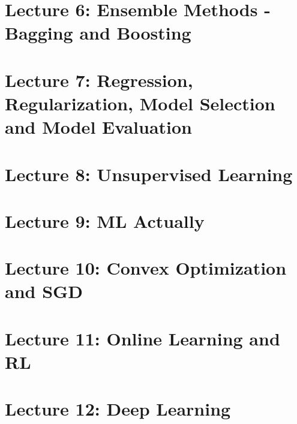 \documentclass[11pt]{article}
\begin{document}
\newpage
\part*{Lecture 6: Ensemble Methods - Bagging and Boosting}
\label{part:lecture_6}


\newpage
\part*{Lecture 7: Regression, Regularization, Model Selection and Model
Evaluation} 
\label{part:lecture_7}



\newpage
\part*{Lecture 8: Unsupervised Learning}
\label{part:lecture_8}



\newpage
\part*{Lecture 9: ML Actually}
\label{part:lecture_9}
%

\newpage
\part*{Lecture 10: Convex Optimization and SGD}
\label{part:lecture_10}
%

\newpage
\part*{Lecture 11: Online Learning and RL}
\label{part:lecture_11}
%

\newpage
\part*{Lecture 12: Deep Learning}
\label{part:lecture_12}
%
\end{document}
